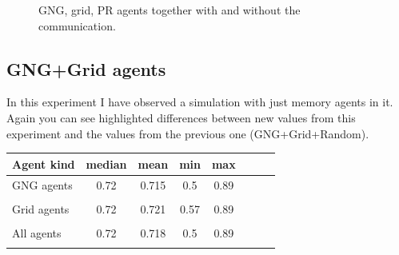 

\begin{figure}[h!]
  \centering      
  \caption{GNG, grid, PR agents together with and without the communication.}
\end{figure} 
              
\clearpage
                                       
\subsection{GNG+Grid agents}

In this experiment I have observed a simulation with just memory agents in it. Again you can see highlighted differences between new values from this experiment and the values from the previous one (GNG+Grid+Random).

\begin{center} 
  \begin{tabular}{l*{6}{c}r}
  Agent kind        & median & mean & min & max \\
  \hline
  GNG agents        & 0.72                  & 0.715                 & 0.5                 & 0.89  \\  
                    & \color{green}{+0.03}  & \color{green}{+0.024} & \color{red}{-0.02}  & \color{green}{+0.03} \\
  Grid agents       & 0.72                  & 0.721                 & 0.57                & 0.89  \\  
                    & \color{green}{+0.02}  & \color{green}{+0.021} & \color{green}{+0.02}& \color{red}{+0.02}   \\
  All agents        & 0.72                  & 0.718                 & 0.5                 & 0.89  \\
                    & \color{green}{+0.02}  & \color{green}{+0.020}  & \color{red}{-0.02}  & \color{green}{+0.02} 
  \end{tabular}                       
\end{center}

